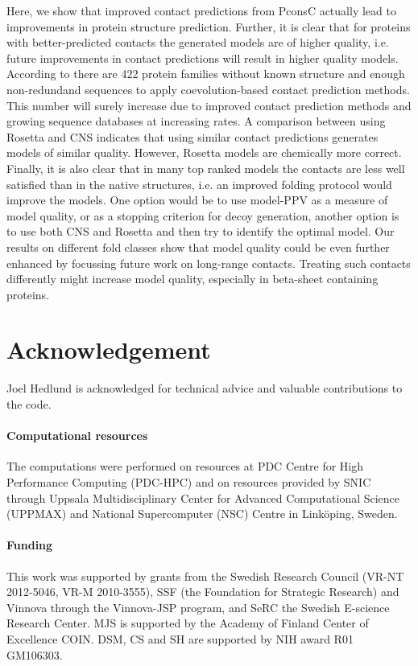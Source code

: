 \documentclass{bioinfo}
\begin{document}
Here, we show that improved contact predictions from PconsC
\cite[]{skwark_PconsC:_2013} actually lead to improvements in protein
structure prediction. Further, it is clear that for proteins with
better-predicted contacts the generated models are of higher quality,
i.e. future improvements in contact predictions will result in higher
quality models. {\color{red}According to
\cite{kamisetty_assessing_2013} there are 422 protein families
without known structure and enough non-redundand sequences to
apply coevolution-based contact prediction methods. This number
will surely increase due to improved contact prediction methods
and growing sequence databases at increasing rates.} A comparison
between using Rosetta and CNS indicates that using similar contact
predictions generates models of similar quality. However, Rosetta
models are chemically more correct. Finally, it is also clear that in
many top ranked models the contacts are less well satisfied than in
the native structures, i.e. an improved folding protocol would improve
the models. One option would be to use model-PPV as a measure of model
quality, or as a stopping criterion for decoy generation, another
option is to use both CNS and Rosetta and then try to identify the
optimal model. {\color{red}Our results on different fold classes show
that model quality could be even further enhanced by focussing future
work on long-range contacts. Treating such contacts differently might
increase model quality, especially in beta-sheet containing proteins.}



\section*{Acknowledgement}
Joel Hedlund is acknowledged for technical advice and valuable contributions to the code. 

\paragraph{Computational resources\textcolon}
The computations were performed on resources at PDC Centre for High
Performance Computing (PDC-HPC) and on resources provided by SNIC
through Uppsala Multidisciplinary Center for Advanced Computational
Science (UPPMAX) and National Supercomputer (NSC) Centre in Link\"oping,
Sweden.

\paragraph{Funding\textcolon} This work was supported by grants from
the Swedish Research Council (VR-NT 2012-5046, VR-M 2010-3555), SSF
(the Foundation for Strategic Research) and Vinnova through the
Vinnova-JSP program, and SeRC the Swedish E-science Research Center.
MJS is supported by the Academy of Finland Center of Excellence COIN.
DSM, CS and SH are supported by NIH award R01 GM106303.


%
%
%
%
%
%
%

\end{document}
